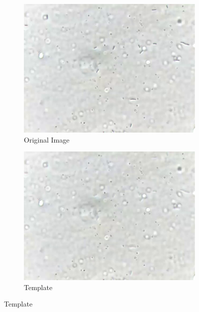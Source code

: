 \documentclass{article}
\begin{document}
\begin{figure}
    \centering
    \begin{subfigure}[b]{.45\linewidth}
    \includegraphics[width=\linewidth]{image000000.png}
    \caption{Original Image}\label{fig:original}
    \end{subfigure}
    \begin{subfigure}[b]{.45\linewidth}
    \includegraphics[width=\linewidth]{template.jpg}
    \caption{Template}\label{fig:template}
    \end{subfigure}
    \caption{Template}
\end{figure}
\end{document}
